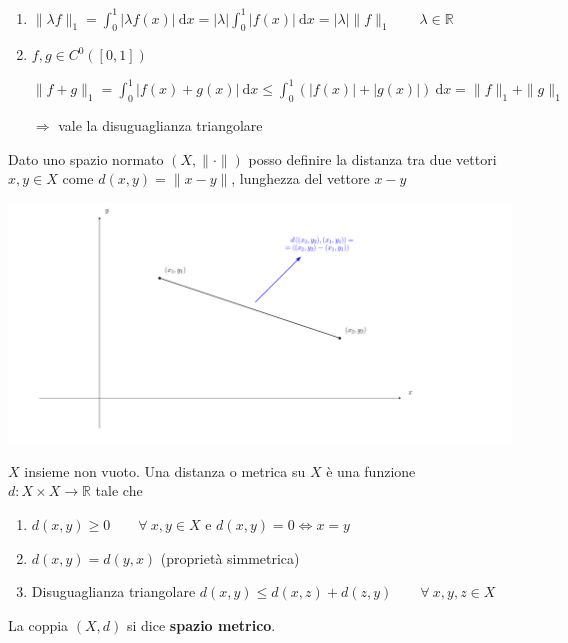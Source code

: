 \begin{exbar}
\begin{example}
\begin{enumerate}
		\item $\parallel \lambda f \parallel_1 = \int_{0}^{1} |\lambda f(x)| \ \mathrm{d}x = |\lambda| \int_{0}^{1} |f(x)| \ \mathrm{d}x = |\lambda| \parallel f \parallel_1 \qquad \lambda \in \mathbb{R}$
		
		\item $f,g \in C^0 ([0,1])$
		
		$\parallel f+g \parallel_1 = \int_{0}^{1} |f(x) + g(x)| \ \mathrm{d}x \leq \int_{0}^{1} (|f(x)| + |g(x)|) \ \mathrm{d}x = \parallel f \parallel_1 + \parallel g \parallel_1$
		
		$\Rightarrow$ vale la disuguaglianza triangolare
	\end{enumerate}
\end{example}
\end{exbar}


\begin{attbar}
	Dato uno spazio normato $(X, \parallel \cdot \parallel)$ posso definire la distanza tra due vettori $x,y \in X$ come $d(x,y)= \parallel x-y \parallel$, lunghezza del vettore $x-y$
	\begin{center}
		\includegraphics[width=0.75\linewidth]{spazi_metrici_e_normati/pag131}
		\label{fig:pag131}
	\end{center}
\end{attbar}


\begin{definition}
	$X$ insieme non vuoto. Una distanza o metrica su $X$ è una funzione \\ %
	$d:X \times X \rightarrow \mathbb{R}$ tale che
	\begin{enumerate}
		\item $d(x,y) \geq 0 \qquad \forall \ x,y \in X $ e $d(x,y) = 0 \iff x = y$
		\item $d(x,y) = d(y,x)$ (proprietà simmetrica)
		\item Disuguaglianza triangolare $d(x,y) \leq d(x,z) + d(z,y) \qquad \forall \ x,y,z \in X$
	\end{enumerate}
	
	La coppia $(X,d)$ si dice \textbf{spazio metrico}.
\end{definition}



